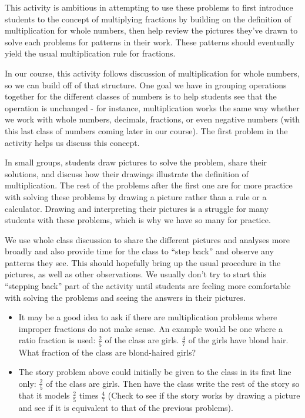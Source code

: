 \documentclass{ximera}
\begin{document}
\newpage
\begin{instructorNotes}
This activity is ambitious in attempting to use these problems to first introduce students to the concept of multiplying fractions by building on the definition of multiplication for whole numbers, then help review the pictures they've drawn to solve each problems for patterns in their work.  These patterns should eventually yield the usual multiplication rule for fractions.  

In our course, this activity follows discussion of multiplication for whole numbers, so we can build off of that structure.  One goal we have in grouping operations together for the different classes of numbers is to help students see that the operation is unchanged - for instance, multiplication works the same way whether we work with whole numbers, decimals, fractions, or even negative numbers (with this last class of numbers coming later in our course).  The first problem in the activity helps us discuss this concept.

In small groups, students draw pictures to solve the problem, share their solutions, and discuss how their drawings illustrate the definition of multiplication.  The rest of the problems after the first one are for more practice with solving these problems by drawing a picture rather than a rule or a calculator.  Drawing and interpreting their pictures is a struggle for many students with these problems, which is why we have so many for practice.

We use whole class discussion to share the different pictures and analyses more broadly and also provide time for the class to ``step back''  and observe any patterns they see.  This should hopefully bring up the usual procedure in the pictures, as well as other observations.  We usually don't try to start this ``stepping back'' part of the activity until students are feeling more comfortable with solving the problems and seeing the answers in their pictures.

\begin{itemize}
     \item It may be a good idea to ask if there are multiplication problems where improper fractions do not make sense.  An example would be one where a ratio fraction is used:  $\frac{2}{5}$ of the class are girls.  $\frac{4}{7}$ of the girls have blond hair.  What fraction of the class are blond-haired girls?
     \item  The story problem above could initially be given to the class in its first line only:  $\frac{2}{5}$ of the class are girls.  Then have the class write the rest of the story so that it models $\frac{2}{5}$ times $\frac{4}{7}$ (Check to see if the story works by drawing a picture and see if it is equivalent to that of the previous problems).
\end{itemize}


\end{instructorNotes}
\end{document}
